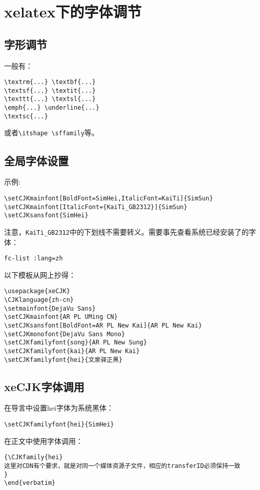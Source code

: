 \section{xelatex下的字体调节}

\subsection{字形调节}
一般有：
\begin{verbatim}
\textrm{...} \textbf{...}
\textsf{...} \textit{...} 
\texttt{...} \textsl{...}
\emph{...} \underline{...}
\textsc{...} 
\end{verbatim}
或者\verb+\itshape \sffamily+等。


\subsection{全局字体设置}
示例:
\begin{lstlisting}[language={[LaTex]Tex}]
\setCJKmainfont[BoldFont=SimHei,ItalicFont=KaiTi]{SimSun}
\setCJKmainfont[ItalicFont={KaiTi_GB2312}]{SimSun}
\setCJKsansfont{SimHei}
\end{lstlisting}
注意，\verb+KaiTi_GB2312+中的下划线不需要转义。需要事先查看系统已经安装了的字体：
\begin{lstlisting}[language={[LaTex]Tex}]
fc-list :lang=zh
\end{lstlisting}
以下模板从网上抄得：
\begin{lstlisting}[language={[LaTex]Tex}]
\usepackage{xeCJK}
\CJKlanguage{zh-cn}
\setmainfont{DejaVu Sans}
\setCJKmainfont{AR PL UMing CN}
\setCJKsansfont[BoldFont=AR PL New Kai]{AR PL New Kai}
\setCJKmonofont{DejaVu Sans Mono}
\setCJKfamilyfont{song}{AR PL New Sung}
\setCJKfamilyfont{kai}{AR PL New Kai}
\setCJKfamilyfont{hei}{文泉驿正黑}
\end{lstlisting}

\subsection{xeCJK字体调用}
在导言中设置hei字体为系统黑体：
\begin{lstlisting}[language={[LaTex]Tex}]
\setCJKfamilyfont{hei}{SimHei}
\end{lstlisting}
在正文中使用字体调用：
\begin{lstlisting}[language={[LaTex]Tex}]
{\CJKfamily{hei}
这里对CDN有个要求，就是对同一个媒体资源子文件，相应的transferID必须保持一致
}
\end{verbatim}
\end{lstlisting}





